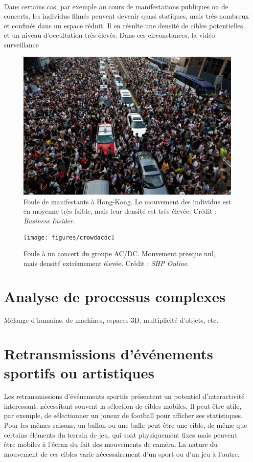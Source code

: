 	\paragraph*{}
	Dans certains cas, par exemple au cours de manifestations publiques ou de concerts, les individus filmés peuvent devenir quasi statiques, mais très nombreux et confinés dans un espace réduit. Il en résulte une densité de cibles potentielles et un niveau d'occultation très élevés. Dans ces circonstances, la vidéo-surveillance 
	
	\begin{figure}[H]
		\centering
		\includegraphics[width=\textwidth]{figures/crowdhk}
		\caption{Foule de manifestants à Hong-Kong. Le mouvement des individus est en moyenne très faible, mais leur densité est très élevée. Crédit : \emph{Business Insider}.}
		\label{fig:crowdhk}
	\end{figure}
	
	\begin{figure}[htb]
		\centering
		\texttt{[image: figures/crowdacdc]}
		\caption{Foule à un concert du groupe AC/DC. Mouvement presque nul, mais densité extrêmement élevée. Crédit : \emph{SHP Online}.}
		\label{fig:crowdacdc}
	\end{figure}
	
	
	
	\section{Analyse de processus complexes}
	Mélange d'humains, de machines, espaces 3D, multiplicité d'objets, etc.
	
	\section{Retransmissions d'événements sportifs ou artistiques}
	Les retransmissions d'événements sportifs présentent un potentiel d'interactivité intéressant, nécessitant souvent la sélection de cibles mobiles. Il peut être utile, par exemple, de sélectionner un joueur de football pour afficher ses statistiques. Pour les mêmes raisons, un ballon ou une balle peut être une cible, de même que certains éléments du terrain de jeu, qui sont physiquement fixes mais peuvent être mobiles à l'écran du fait des mouvements de caméra. La nature du mouvement de ces cibles varie nécessairement d'un sport ou d'un jeu à l'autre.
	
